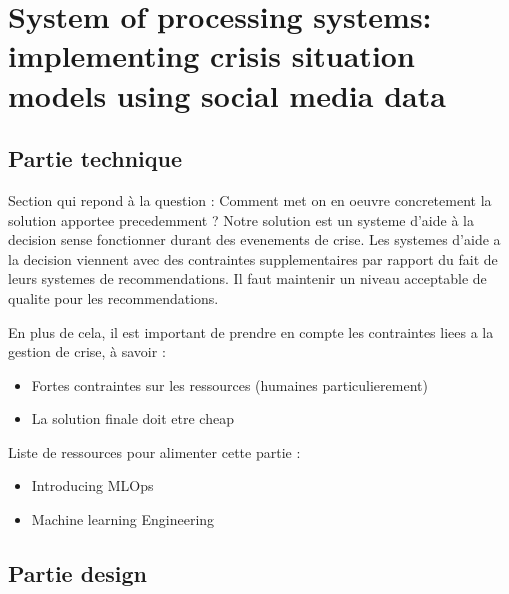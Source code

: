 \chapter*{System of processing systems: implementing crisis situation models using social media data}


\section{Partie technique}
Section qui repond à la question : Comment met on en oeuvre concretement la solution apportee precedemment ?
Notre solution est un systeme d'aide à la decision sense fonctionner durant des evenements de crise.
Les systemes d'aide a la decision viennent avec des contraintes supplementaires par rapport du fait de leurs systemes de recommendations.
Il faut maintenir un niveau acceptable de qualite pour les recommendations.

En plus de cela, il est important de prendre en compte les contraintes liees a la gestion de crise, à savoir :
\begin{itemize}
    \item Fortes contraintes sur les ressources (humaines particulierement)
    \item La solution finale doit etre cheap
\end{itemize}

Liste de ressources pour alimenter cette partie :
\begin{itemize}
    \item Introducing MLOps
    \item Machine learning Engineering
\end{itemize}


\section{Partie design}

